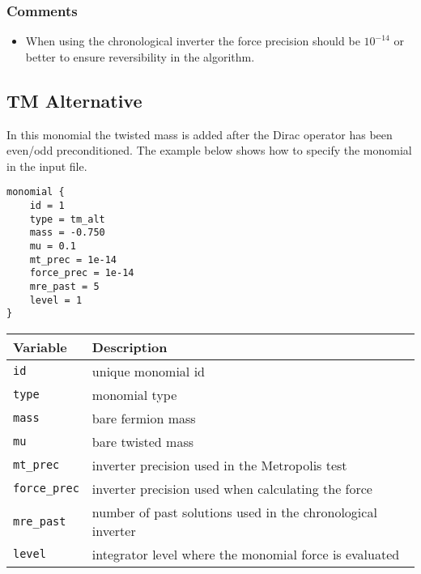 \documentclass[12pt]{article}
\begin{document}
\subsubsection*{Comments}
\begin{itemize}
 \item When using the chronological inverter the force precision should be $10^{-14}$ or better to ensure reversibility in the algorithm.
\end{itemize}

\newpage
\subsection*{TM Alternative}
In this monomial the twisted mass is added after the Dirac operator has been even/odd preconditioned. The example below shows how to specify the monomial in the input file.
\begin{center}
\begin{minipage}{55mm}
\begin{framed}
\begin{verbatim}
monomial {
    id = 1
    type = tm_alt
    mass = -0.750
    mu = 0.1
    mt_prec = 1e-14
    force_prec = 1e-14
    mre_past = 5
    level = 1
}
\end{verbatim}
\vspace{-5mm}
\end{framed}
\end{minipage}
\end{center}

\vspace{2mm}

\begin{center}
\begin{tabular}{l|l}
 Variable & Description \\
 \hline
 \verb|id|         & unique monomial id \\
 \verb|type|       & monomial type \\
 \verb|mass|       & bare fermion mass \\
 \verb|mu|         & bare twisted mass\\
 \verb|mt_prec|    & inverter precision used in the Metropolis test \\
 \verb|force_prec| & inverter precision used when calculating the force \\
 \verb|mre_past|   & number of past solutions used in the chronological inverter \\
 \verb|level|      & integrator level where the monomial force is evaluated
\end{tabular}
\end{center}
\end{document}
